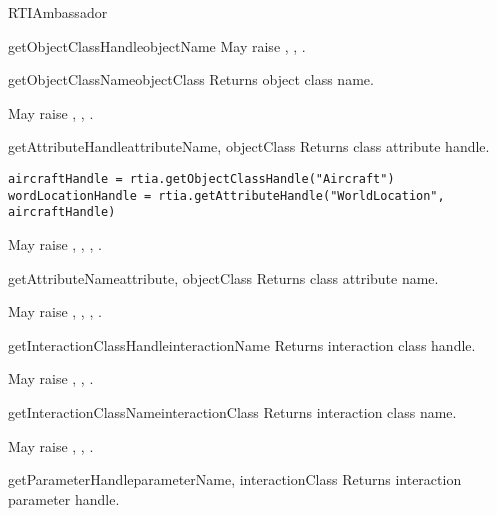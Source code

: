 \begin{classdesc}{RTIAmbassador}{}
\begin{methoddesc}{getObjectClassHandle}{objectName}
May raise
,
,
.
\end{methoddesc}

\begin{methoddesc}{getObjectClassName}{objectClass}
Returns object class name.

May raise
,
,
.
\end{methoddesc}

\begin{methoddesc}{getAttributeHandle}{attributeName, objectClass}
Returns class attribute handle.

\begin{verbatim} 
aircraftHandle = rtia.getObjectClassHandle("Aircraft")
wordLocationHandle = rtia.getAttributeHandle("WorldLocation", aircraftHandle)
\end{verbatim}

May raise
,
,
,
.
\end{methoddesc}

\begin{methoddesc}{getAttributeName}{attribute, objectClass}
Returns class attribute name.

May raise
,
,
,
.
\end{methoddesc}

\begin{methoddesc}{getInteractionClassHandle}{interactionName}
Returns interaction class handle.

May raise
,
,
.
\end{methoddesc}

\begin{methoddesc}{getInteractionClassName}{interactionClass}
Returns interaction class name.

May raise
,
,
.
\end{methoddesc}

\begin{methoddesc}{getParameterHandle}{parameterName, interactionClass}
Returns interaction parameter handle.


\end{methoddesc}
\end{classdesc}
